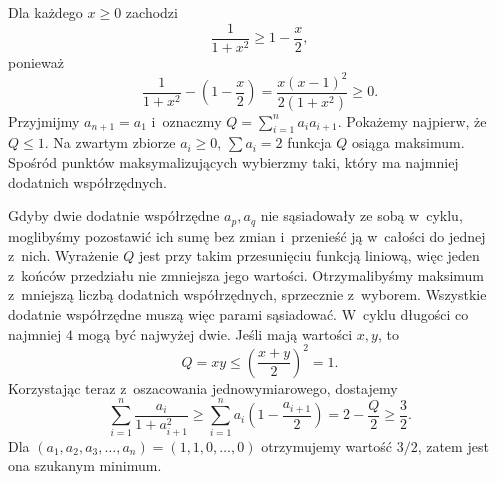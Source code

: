\documentclass{lecture-kuznia}
\begin{document}
\begin{solution*}[\ref{Z15}]
	Dla każdego $x\geqslant0$ zachodzi
	\[
		\frac1{1+x^2}\geqslant1-\frac x2,
	\]
	ponieważ
	\[
		\frac1{1+x^2}-\left(1-\frac x2\right)
		=\frac{x(x-1)^2}{2(1+x^2)}\geqslant0.
	\]
	Przyjmijmy $a_{n+1}=a_1$ i~oznaczmy
	$Q=\sum_{i=1}^n a_ia_{i+1}$. Pokażemy najpierw, że $Q\leqslant1$.
	Na zwartym zbiorze $a_i\geqslant0$, $\sum a_i=2$ funkcja $Q$ osiąga
	maksimum. Spośród punktów maksymalizujących wybierzmy taki, który ma
	najmniej dodatnich współrzędnych.

	Gdyby dwie dodatnie współrzędne $a_p,a_q$ nie sąsiadowały ze sobą
	w~cyklu, moglibyśmy pozostawić ich sumę bez zmian i~przenieść ją w~całości
	do jednej z~nich. Wyrażenie $Q$ jest przy takim przesunięciu funkcją
	liniową, więc jeden z~końców przedziału nie zmniejsza jego wartości.
	Otrzymalibyśmy maksimum z~mniejszą liczbą dodatnich współrzędnych,
	sprzecznie z~wyborem. Wszystkie dodatnie współrzędne muszą więc parami
	sąsiadować. W~cyklu długości co najmniej $4$ mogą być najwyżej dwie.
	Jeśli mają wartości $x,y$, to
	\[
		Q=xy\leqslant\left(\frac{x+y}{2}\right)^2=1.
	\]
	Korzystając teraz z~oszacowania jednowymiarowego, dostajemy
	\[
		\sum_{i=1}^n\frac{a_i}{1+a_{i+1}^2}
		\geqslant\sum_{i=1}^na_i\left(1-\frac{a_{i+1}}2\right)
		=2-\frac Q2\geqslant\frac32.
	\]
	Dla $(a_1,a_2,a_3,\dots,a_n)=(1,1,0,\dots,0)$ otrzymujemy wartość
	$3/2$, zatem jest ona szukanym minimum.
\end{solution*}

\fi
\end{document}
